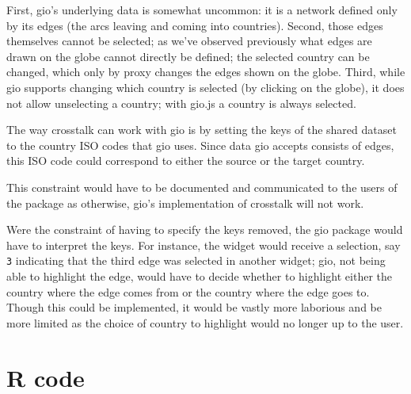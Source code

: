 \documentclass[10pt,]{krantz}
\makeatletter
\newenvironment{Shaded}{\begin{snugshade}}{\end{snugshade}}
\newcommand{\CommentTok}[1]{\textcolor[rgb]{0.37,0.37,0.37}{\textit{#1}}}
\newcommand{\DataTypeTok}[1]{\textcolor[rgb]{0.27,0.27,0.27}{#1}}
\newcommand{\KeywordTok}[1]{\textcolor[rgb]{0.27,0.27,0.27}{\textbf{#1}}}
\newcommand{\NormalTok}[1]{#1}
\newcommand{\OperatorTok}[1]{\textcolor[rgb]{0.43,0.43,0.43}{\textbf{#1}}}
\newcommand{\StringTok}[1]{\textcolor[rgb]{0.5,0.5,0.5}{#1}}
\newenvironment{kframe}{%
\medskip{}
\setlength{\fboxsep}{.8em}
 \def\at@end@of@kframe{}%
 \ifinner\ifhmode%
  \def\at@end@of@kframe{\end{minipage}}%
  \begin{minipage}{\columnwidth}%
 \fi\fi%
 \def\FrameCommand##1{\hskip\@totalleftmargin \hskip-\fboxsep
 \colorbox{shadecolor}{##1}\hskip-\fboxsep
     \hskip-\linewidth \hskip-\@totalleftmargin \hskip\columnwidth}%
 \MakeFramed {\advance\hsize-\width
   \@totalleftmargin\z@ \linewidth\hsize
   \@setminipage}}%
 {\par\unskip\endMakeFramed%
 \at@end@of@kframe}
\renewenvironment{Shaded}{\begin{kframe}}{\end{kframe}}
\makeatother
\begin{document}
First, gio's underlying data is somewhat uncommon: it is a network defined only by its edges (the arcs leaving and coming into countries). Second, those edges themselves cannot be selected; as we've observed previously what edges are drawn on the globe cannot directly be defined; the selected country can be changed, which only by proxy changes the edges shown on the globe. Third, while gio supports changing which country is selected (by clicking on the globe), it does not allow unselecting a country; with gio.js a country is always selected.

The way crosstalk can work with gio is by setting the keys of the shared dataset to the country ISO codes that gio uses. Since data gio accepts consists of edges, this ISO code could correspond to either the source or the target country.

\begin{Shaded}
\end{Shaded}

This constraint would have to be documented and communicated to the users of the package as otherwise, gio's implementation of crosstalk will not work.

Were the constraint of having to specify the keys removed, the gio package would have to interpret the keys. For instance, the widget would receive a selection, say \texttt{3} indicating that the third edge was selected in another widget; gio, not being able to highlight the edge, would have to decide whether to highlight either the country where the edge comes from or the country where the edge goes to. Though this could be implemented, it would be vastly more laborious and be more limited as the choice of country to highlight would no longer up to the user.

\hypertarget{linking-widgets-r}{%
\section{R code}\label{linking-widgets-r}}
\end{document}
